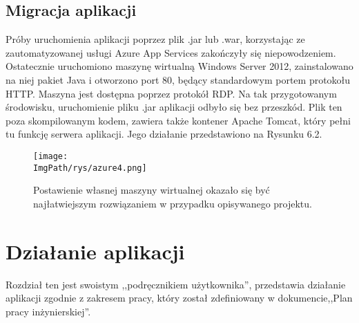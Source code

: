 \documentclass[a4paper,12pt,twoside,openany]{report}
\newcommand{\ImgPath}{.}
\begin{document}
\section{Migracja aplikacji}
Próby uruchomienia aplikacji poprzez plik .jar lub .war, korzystając ze zautomatyzowanej usługi Azure App Services zakończyły się niepowodzeniem. Ostatecznie uruchomiono maszynę wirtualną Windows Server 2012, zainstalowano na niej pakiet Java i otworzono port 80, będący standardowym portem protokołu HTTP. Maszyna jest dostępna poprzez protokół RDP. Na tak przygotowanym środowisku, uruchomienie pliku .jar aplikacji odbyło się bez przeszkód. Plik ten poza skompilowanym kodem, zawiera także kontener Apache Tomcat, który pełni tu funkcję serwera aplikacji. Jego działanie przedstawiono na Rysunku 6.2.
				\begin{figure}[!htbp]
					\begin{center}
						\centering
						\texttt{[image: \\ImgPath/rys/azure4.png]}
					\end{center}
					\caption{Postawienie własnej maszyny wirtualnej okazało się być najłatwiejszym rozwiązaniem w przypadku opisywanego projektu.}
					\label{UMLTS}
				\end{figure}
\chapter{Działanie aplikacji}
Rozdział ten jest swoistym ,,podręcznikiem użytkownika'', przedstawia działanie aplikacji zgodnie z zakresem pracy, który został zdefiniowany w dokumencie,,Plan pracy inżynierskiej''.
\end{document}

